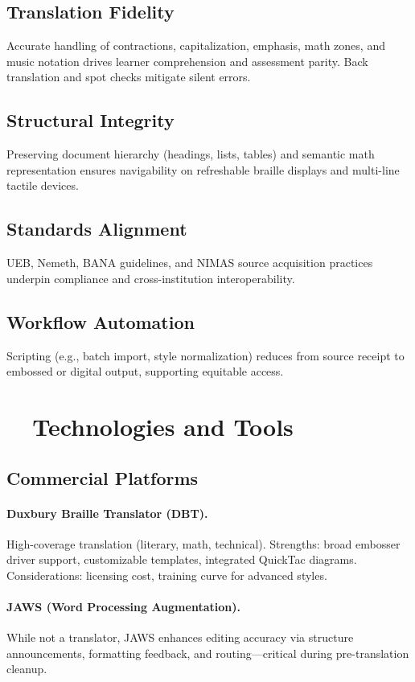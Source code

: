 \subsection*{Translation Fidelity}
Accurate handling of contractions, capitalization, emphasis, math zones, and music notation drives learner comprehension and assessment parity. Back translation and spot checks mitigate silent errors.

\subsection*{Structural Integrity}
Preserving document hierarchy (headings, lists, tables) and semantic math representation ensures navigability on refreshable braille displays and multi-line tactile devices.

\subsection*{Standards Alignment}
UEB, Nemeth, BANA  guidelines, and NIMAS source acquisition practices underpin compliance and cross-institution interoperability.

\subsection*{Workflow Automation}
Scripting (e.g., batch import, style normalization) reduces  from source receipt to embossed or digital output, supporting equitable access.

\section{~~Technologies and Tools}\label{ch12:sec:technologies-tools}
\subsection{Commercial Platforms}
\paragraph{Duxbury Braille Translator (DBT).} High-coverage translation (literary, math, technical)\supercite{DuxburyDBT, DuxburySystems}. Strengths: broad embosser driver support, customizable templates, integrated QuickTac diagrams. Considerations: licensing cost, training curve for advanced styles.

\paragraph{JAWS (Word Processing Augmentation).} While not a translator, JAWS\supercite{FreedomScientificJAWS, JAWSFeatures} enhances editing accuracy via structure announcements, formatting feedback, and  routing—critical during pre-translation cleanup.

